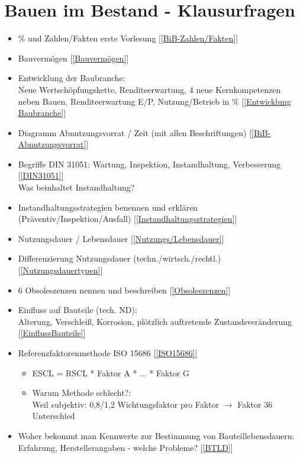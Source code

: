 \documentclass[fleqn,twoside,dvipsnames]{article}
\begin{document}
\newpage

\section{Bauen im Bestand - Klausurfragen}
        \begin{itemize}
            \item \% und Zahlen/Fakten erste Vorlesung [\ref{BiB-Zahlen/Fakten}]
            \item Bauvermögen [\ref{Bauvermögen}]
            \item Entwicklung der Baubranche:\\
            Neue Wertschöpfungskette, Renditeerwartung, 4 neue Kernkompetenzen neben Bauen, Renditeerwartung E/P, Nutzung/Betrieb in \% [\ref{Entwicklung Baubranche}]
            \item Diagramm Abnutzungsvorrat / Zeit (mit allen Beschriftungen) [\ref{BiB-Abnutzungsvorrat}]
            \item Begriffe DIN 31051: Wartung, Inspektion, Instandhaltung, Verbesserung [\ref{DIN31051}]\\ Was beinhaltet Instandhaltung?
            \item Instandhaltungsstrategien benennen und erklären (Präventiv/Inspektion/Ausfall) [\ref{Instandhaltungsstrategien}]
            \item Nutzungsdauer / Lebensdauer [\ref{Nutzungs/Lebensdauer}]
            \item Differenzierung Nutzungsdauer (techn./wirtsch./rechtl.) [\ref{Nutzungsdauertypen}]
            \item 6 Obsoleszenzen nennen und beschreiben [\ref{Obsoleszenzen}]
            \item Einfluss auf Bauteile (tech. ND): \\ 
            Alterung, Verschleiß, Korrosion, plötzlich auftretende Zustandsveränderung [\ref{EinflussBauteile}]
            \item Referenzfaktorenmethode ISO 15686 [\ref{ISO15686}]
                \begin{itemize}
                    \item ESCL = RSCL * Faktor A * ... * Faktor G
                    \item Warum Methode schlecht?:\\ Weil subjektiv: 0,8/1,2 Wichtungsfaktor pro Faktor $\rightarrow$ Faktor 36 Unterschied
                \end{itemize}
            \item Woher bekommt man Kennwerte zur Bestimmung von Bauteillebensdauern: Erfahrung, Herstellerangaben - welche Probleme? [\ref{BTLD}]

\end{itemize}
\end{document}
